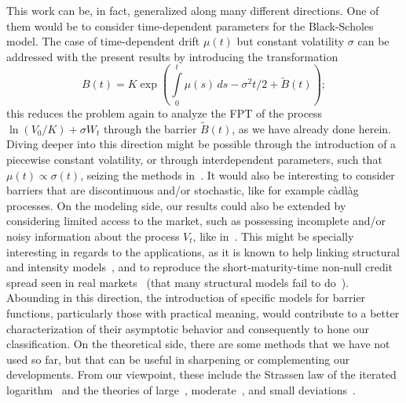 \documentclass[12pt]{article}
\theoremstyle{definition}
\begin{document}
This work can be, in fact, generalized along many different directions. One of them would be to consider time-dependent parameters for the Black-Scholes model. The case of time-dependent drift $\mu(t)$ but constant volatility $\sigma$ can be addressed with the present results by introducing the transformation
$$
B(t)=K \exp \!\left(\int\limits_0^t \mu(s) \, ds -\sigma^2 t/2+\tilde{B}(t) \!\right);
$$
this reduces the problem again to analyze the FPT of the process $\ln(V_0/K)+\sigma W_t$ through the barrier $\tilde{B}(t)$, as we have already done herein. Diving deeper into this direction might be possible through the introduction of a piecewise constant volatility, or through interdependent parameters, such that $\mu(t)\propto\sigma(t)$, seizing the methods in~\cite{brigo2009credit,molini2011first}. It would also be interesting to consider barriers that are discontinuous and/or stochastic, like for example c\`adl\`ag processes. On the modeling side, our results could also be extended by considering limited access to the market, such as possessing incomplete and/or noisy information about the process $V_t$, like in~\cite{duffie2001term}. This might be specially interesting in regards to the applications, as it is known to help linking structural and intensity models~\cite{jarrow2012structural}, and to reproduce the short-maturity-time non-null credit spread seen in real markets~\cite{duffie2001term} (that many structural models fail to do~\cite{goldstein2001ebit}). Abounding in this direction, the introduction of specific models for barrier functions, particularly those with practical meaning, would contribute to a better characterization of their asymptotic behavior and consequently to hone our classification. On the theoretical side, there are some methods that we have not used so far, but that can be useful in sharpening or complementing our developments. From our viewpoint, these include the Strassen law of the iterated logarithm~\cite{Strassen1964,SzuszVolkmann1982} and the theories of large~\cite{GerholdGerstenecker2020}, moderate~\cite{Chen2005}, and small deviations~\cite{deAcosta1983smalldeviations}.

\end{document}
